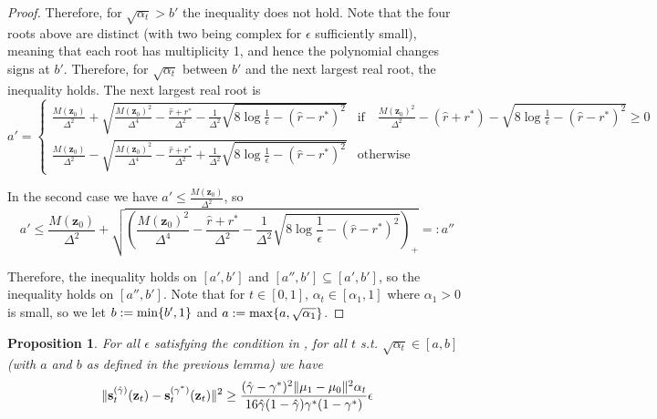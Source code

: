\documentclass[11pt]{article}
\newcommand{\fitparenth}[1]{\left(#1\right)}
\newcommand{\vect}[1]{\mathbf{#1}}
\theoremstyle{plain}
\newtheorem{proposition}[theorem]{Proposition}
\newcommand{\1}{\mathbbm{1}}
\DeclarePairedDelimiter{\norm}{\lVert}{\rVert}
\DeclarePairedDelimiter{\set}{\lbrace}{\rbrace}
\newcommand{\score}[2][]{\vect{s}_{#1}^{(#2)}}
\newcommand{\separation}{\Delta}
\begin{document}
\begin{appendices}
\begin{proof}
    Therefore, for $\sqrt{\alpha_t}>b'$ the inequality does not hold. Note that the four roots above are distinct (with two being complex for $\epsilon$ sufficiently small), meaning that each root has multiplicity 1, and hence the polynomial changes signs at $b'$. Therefore, for $\sqrt{\alpha_t}$ between $b'$ and the next largest real root, the inequality holds. The next largest real root is
    \[a'=\begin{cases}
        \frac{M(\vect z_0)}{\separation^2} +\sqrt{\frac{M(\vect z_0)^2}{\separation^4}-\frac{\hat r+r^*}{\separation^2}-\frac{1}{\separation^2}\sqrt{8\log \frac{1}{\epsilon}-(\hat r-r^*)^2}} & \text{if}\quad \frac{M(\vect z_0)^2}{\separation^2}-(\hat r+r^*)-\sqrt{8\log \frac{1}{\epsilon}-(\hat r-r^*)^2} \geq0
        \\
        \frac{M(\vect z_0)}{\separation^2} -\sqrt{\frac{M(\vect z_0)^2}{\separation^4}-\frac{\hat r+r^*}{\separation^2}+\frac{1}{\separation^2}\sqrt{8\log \frac{1}{\epsilon}-(\hat r-r^*)^2}} & \text{otherwise}
    \end{cases}\]
    
    In the second case we have $a'\leq \frac{M(\vect z_0)}{\separation^2}$, so
    \[a'\leq \frac{M(\vect z_0)}{\separation^2} +\sqrt{\fitparenth{\frac{M(\vect z_0)^2}{\separation^4}-\frac{\hat r+r^*}{\separation^2}-\frac{1}{\separation^2}\sqrt{8\log \frac{1}{\epsilon}-(\hat r-r^*)^2}}_+}=:a'' \]
    
    Therefore, the inequality holds on $[a',b']$ and $[a'',b']\subseteq [a',b']$, so the inequality holds on $[a'',b']$. Note that for $t\in [0,1]$, $\alpha_t\in [\alpha_1, 1]$ where $\alpha_1 >0$ is small, so we let $b:= \min\set{b', 1}$ and $a:=\max\set{a,\sqrt{\alpha_1}}$.
\end{proof}


\begin{proposition}\label{prop: lower bound over t}
    For all $\epsilon$ satisfying the condition in  , for all $t$ s.t. $\sqrt{\alpha_t}\in[a,b]$ (with $a$ and $b$ as defined in the previous lemma) we have
    \begin{align*}
        \norm{\score[t]{\hat \gamma}(\vect z_t) - \score[t]{\gamma^{*}}(\vect z_t)}^2\geq\frac{(\hat \gamma-\gamma^*)^2\norm{ \mu_1- \mu_0}^2 \alpha_t}{16 \hat \gamma (1-\hat \gamma) \gamma^* (1-\gamma^*)}\epsilon
    \end{align*}
    
\end{proposition}


\end{appendices}
\end{document}
